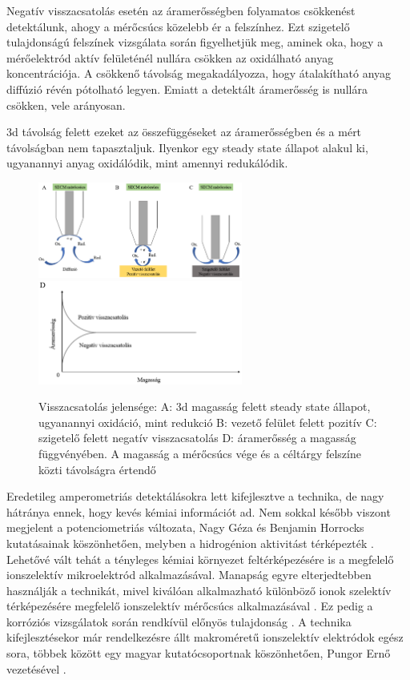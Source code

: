 Negatív visszacsatolás esetén az áramerősségben folyamatos csökkenést detektálunk, ahogy a mérőcsúcs közelebb ér a felszínhez. Ezt szigetelő tulajdonságú felszínek vizsgálata során figyelhetjük meg, aminek oka, hogy a mérőelektród aktív felületénél nullára csökken az oxidálható anyag koncentrációja. A csökkenő távolság megakadályozza, hogy átalakítható anyag diffúzió révén pótolható legyen. Emiatt a detektált áramerősség is nullára csökken, vele arányosan.

3d távolság felett ezeket az összefüggéseket az áramerősségben és a mért távolságban nem tapasztaljuk. Ilyenkor egy steady state állapot alakul ki, ugyanannyi anyag oxidálódik, mint amennyi redukálódik.

\begin{figure}
\centering
\includegraphics[width=0.6\textwidth]{img/feedback.eps}
\includegraphics[width=0.6\textwidth]{img/feedback2.eps}
\caption{Visszacsatolás jelensége:
A: 3d magasság felett steady state állapot, ugyanannyi oxidáció, mint redukció
B: vezető felület felett pozitív
C: szigetelő felett negatív visszacsatolás
D: áramerősség a magasság függvényében. A magasság a mérőcsúcs vége és a céltárgy felszíne közti távolságra értendő}
\label{fig:feedback}
\end{figure}

Eredetileg amperometriás detektálásokra lett kifejlesztve a technika, de nagy hátránya ennek, hogy kevés kémiai információt ad. Nem sokkal később viszont megjelent a potenciometriás változata, Nagy Géza és Benjamin Horrocks kutatásainak köszönhetően, melyben a hidrogénion aktivitást térképezték \cite{horrocks1993scanning}. Lehetővé vált tehát a tényleges kémiai környezet feltérképezésére is a megfelelő ionszelektív mikroelektród alkalmazásával. Manapság egyre elterjedtebben használják a technikát, mivel kiválóan alkalmazható különböző ionok szelektív térképezésére megfelelő ionszelektív mérőcsúcs alkalmazásával \cite{souto2011spatially}. Ez pedig a korróziós vizsgálatok során rendkívül előnyös tulajdonság \cite{souto2013spatially}. A technika kifejlesztésekor már rendelkezésre állt makroméretű ionszelektív elektródok egész sora, többek között egy magyar kutatócsoportnak köszönhetően, Pungor Ernő vezetésével \cite{pungor1978ion}.


